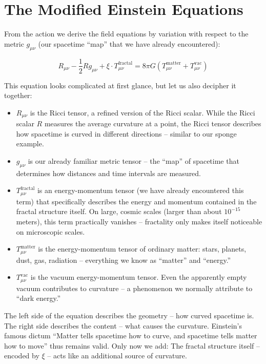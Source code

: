 \section{The Modified Einstein Equations}

From the action we derive the field equations by variation with respect to the metric $g_{\mu\nu}$ (our spacetime ``map'' that we have already encountered):

\begin{equation}
R_{\mu\nu} - \frac{1}{2} R g_{\mu\nu} + \xi \cdot T_{\mu\nu}^{\text{fractal}} = 8\pi G \left( T_{\mu\nu}^{\text{matter}} + T_{\mu\nu}^{\text{vac}} \right)
\end{equation}

This equation looks complicated at first glance, but let us also decipher it together:

\begin{itemize}[leftmargin=*]
\item \textbf{$R_{\mu\nu}$} is the Ricci tensor, a refined version of the Ricci scalar. While the Ricci scalar $R$ measures the average curvature at a point, the Ricci tensor describes how spacetime is curved in different directions -- similar to our sponge example.

\item \textbf{$g_{\mu\nu}$} is our already familiar metric tensor -- the ``map'' of spacetime that determines how distances and time intervals are measured.

\item \textbf{$T_{\mu\nu}^{\text{fractal}}$} is an energy-momentum tensor (we have already encountered this term) that specifically describes the energy and momentum contained in the fractal structure itself. On large, cosmic scales (larger than about $10^{-15}$ meters), this term practically vanishes -- fractality only makes itself noticeable on microscopic scales.

\item \textbf{$T_{\mu\nu}^{\text{matter}}$} is the energy-momentum tensor of ordinary matter: stars, planets, dust, gas, radiation -- everything we know as ``matter'' and ``energy.''

\item \textbf{$T_{\mu\nu}^{\text{vac}}$} is the vacuum energy-momentum tensor. Even the apparently empty vacuum contributes to curvature -- a phenomenon we normally attribute to ``dark energy.''
\end{itemize}

The left side of the equation describes the geometry -- how curved spacetime is. The right side describes the content -- what causes the curvature. Einstein's famous dictum ``Matter tells spacetime how to curve, and spacetime tells matter how to move'' thus remains valid. Only now we add: The fractal structure itself -- encoded by $\xi$ -- acts like an additional source of curvature.

